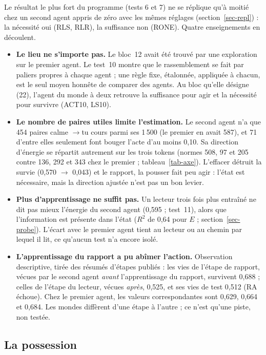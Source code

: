 \documentclass[11pt,a4paper]{article}
\begin{document}
Le résultat le plus fort du programme (tests 6 et 7) ne se réplique qu'à moitié chez
un second agent appris de zéro avec les mêmes réglages (section~\ref{sec-repl}) : la
nécessité oui (RLS, RLR), la suffisance non (RONE). Quatre enseignements en
découlent.
\begin{itemize}
\item \textbf{Le lieu ne s'importe pas.} Le bloc~12 avait été trouvé par une
exploration sur le premier agent. Le test~10 montre que le rassemblement se fait
par paliers propres à chaque agent ; une règle fixe, étalonnée, appliquée à chacun,
est le seul moyen honnête de comparer des agents. Au bloc qu'elle désigne (22),
l'agent du monde à deux retrouve la suffisance pour agir et la nécessité pour
survivre (ACT10, LS10).
\item \textbf{Le nombre de paires utiles limite l'estimation.} Le second agent n'a
que 454 paires \og calme \fg{}$\to$\og tu cours \fg{} parmi ses 1\,500 (le premier
en avait 587), et 71 d'entre elles seulement font bouger l'acte d'au moins 0,10. Sa
direction d'énergie se répartit autrement sur les trois tokens (normes 508, 97 et
205 contre 136, 292 et 343 chez le premier ; tableau~\ref{tab-axe}). L'effacer
détruit la survie (0,570 $\to$ 0,043) et le rapport, la pousser fait peu agir :
l'état est nécessaire, mais la direction ajustée n'est pas un bon levier.
\item \textbf{Plus d'apprentissage ne suffit pas.} Un lecteur trois fois plus
entraîné ne dit pas mieux l'énergie du second agent (0,595 ; test~11), alors que
l'information est présente dans l'état ($R^2$ de 0,64 pour $E$ ;
section~\ref{sec-probe}). L'écart avec le premier agent tient au lecteur ou au
chemin par lequel il lit, ce qu'aucun test n'a encore isolé.
\item \textbf{L'apprentissage du rapport a pu abîmer l'action.} Observation
descriptive, tirée des résumés d'étapes publiés : les vies de l'étape de rapport,
vécues par le second agent \emph{avant} l'apprentissage du rapport, survivent
0,688 ; celles de l'étape du lecteur, vécues \emph{après}, 0,525, et ses vies de
test 0,512 (RA échoue). Chez le premier agent, les valeurs correspondantes sont
0,629, 0,664 et 0,684. Les mondes diffèrent d'une étape à l'autre ; ce n'est
qu'une piste, non testée.
\end{itemize}

\subsection{La possession}
\end{document}

